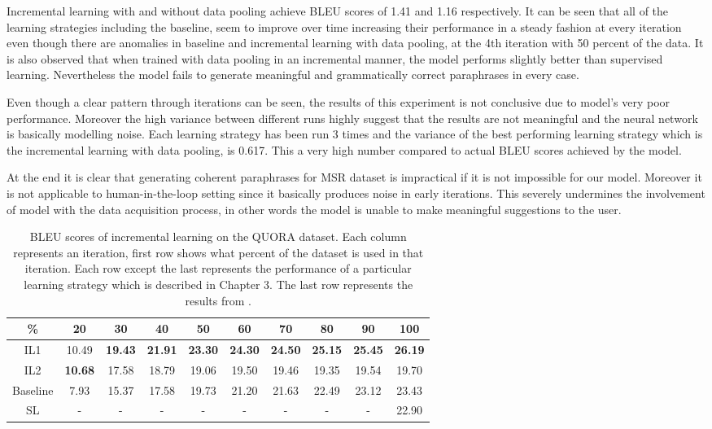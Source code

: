 Incremental learning with and without data pooling achieve BLEU scores of 1.41 and 1.16 respectively. It can be seen that all of the learning strategies including the baseline, seem to improve over time increasing their performance in a steady fashion at every iteration even though there are anomalies in baseline and incremental learning with data pooling, at the 4th iteration with 50 percent of the data. It is also observed that when trained with data pooling in an incremental manner, the model performs slightly better than supervised learning. Nevertheless the model fails to generate meaningful and grammatically correct paraphrases in every case.

Even though a clear pattern through iterations can be seen, the results of this experiment is not conclusive due to model's very poor performance. Moreover the high variance between different runs highly suggest that the results are not meaningful and the neural network is basically modelling noise. Each learning strategy has been run 3 times and the variance of the best performing learning strategy which is the incremental learning with data pooling, is 0.617. This a very high number compared to actual BLEU scores achieved by the model. 

At the end it is clear that generating coherent paraphrases for MSR dataset is impractical if it is not impossible for our model. Moreover it is not applicable to human-in-the-loop setting since it basically produces noise in early iterations. This severely undermines the involvement of model with the data acquisition process, in other words the model is unable to make meaningful suggestions to the user.

\begin{table}[b]
\centering
\small
 \begin{tabular}{|c | c | c | c | c | c | c | c | c | c |} 
 \hline
 \% & 20 & 30 & 40 & 50 & 60 & 70 & 80 & 90 & 100 \\ [0.5ex] 
 \hline
  IL1 & 10.49 &  \textbf{19.43} & \textbf{21.91} &  \textbf{23.30} &  \textbf{24.30} &  \textbf{24.50} &  \textbf{25.15} &  \textbf{25.45} &  \textbf{26.19}  \\ 
 \hline
  IL2 &  \textbf{10.68} & 17.58 & 18.79 & 19.06 & 19.50 & 19.46 & 19.35 & 19.54 & 19.70 \\ 
 \hline
 Baseline & 7.93 & 15.37 & 17.58 & 19.73 & 21.20 & 21.63 & 22.49 & 23.12 & 23.43 \\ 
 \hline
 SL & - & - & - & - & - & - & - & - & 22.90  \\ 
 \hline
\end{tabular}
\caption{BLEU scores of incremental learning on the QUORA dataset. Each column represents an iteration, first row shows what percent of the dataset is used in that iteration. Each row except the last represents the performance of a particular learning strategy which is described in Chapter 3. The last row represents the results from \cite{Guptaetal}.}
\label{table:4.2}
\end{table}


